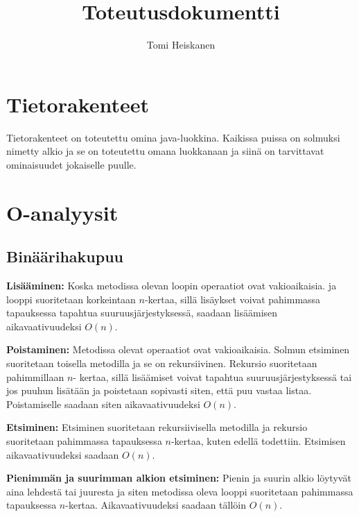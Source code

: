 \documentclass[12pt,a4paper,leqno,titlepage,twoside]{article}
\begin{document}
\title{Toteutusdokumentti}
\author{Tomi Heiskanen}
\maketitle

\newpage
\section*{Tietorakenteet}

Tietorakenteet on toteutettu omina java-luokkina. Kaikissa puissa on solmuksi
nimetty alkio ja se on toteutettu omana luokkanaan ja siinä on tarvittavat
ominaisuudet jokaiselle puulle.

\section*{O-analyysit}

\subsection*{Binäärihakupuu}

\begin{description}
\item{\textbf{Lisääminen:}} Koska metodissa olevan loopin operaatiot ovat vakioaikaisia.
ja looppi suoritetaan korkeintaan $n$-kertaa, sillä lisäykset voivat pahimmassa
tapauksessa tapahtua suuruusjärjestyksessä, saadaan lisäämisen aikavaativuudeksi
$O(n)$.

\item{\textbf{Poistaminen:}} Metodissa olevat operaatiot ovat vakioaikaisia. Solmun
etsiminen suoritetaan toisella metodilla ja se on rekursiivinen. Rekursio
suoritetaan pahimmillaan $n$- kertaa, sillä lisäämiset voivat tapahtua suuruusjärjestyksessä
tai jos puuhun lisätään ja poistetaan sopivasti siten, että puu vastaa listaa.
Poistamiselle saadaan siten aikavaativuudeksi $O(n)$.

\item{\textbf{Etsiminen:}} Etsiminen suoritetaan rekursiivisella metodilla ja
rekursio suoritetaan pahimmassa tapauksessa $n$-kertaa, kuten edellä todettiin. 
Etsimisen aikavaativuudeksi saadaan $O(n)$.

\item{\textbf{Pienimmän ja suurimman alkion etsiminen:}} Pienin ja suurin alkio
löytyvät aina lehdestä tai juuresta ja siten metodissa oleva looppi suoritetaan 
pahimmassa tapauksessa $n$-kertaa. Aikavaativuudeksi saadaan tällöin $O(n)$.
\end{description}
\end{document}
